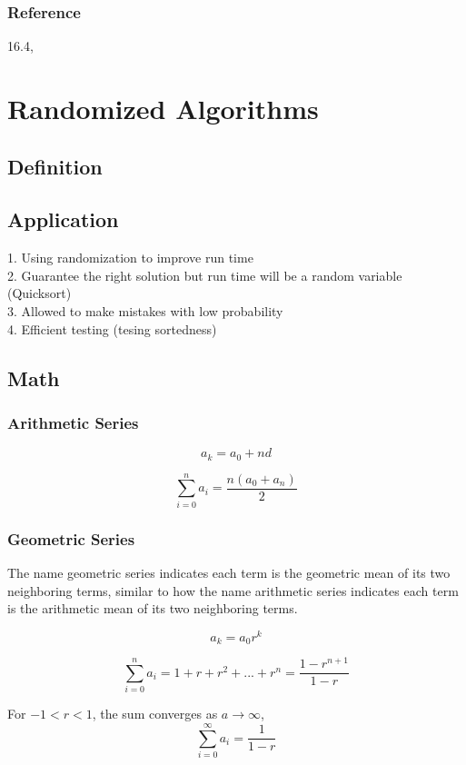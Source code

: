 \documentclass[12pt,article]{article}
\begin{document}
\subsubsection{Reference}
16.4, \cite{CLRS}


\newpage
\section{Randomized Algorithms}

\subsection{Definition}

\subsection{Application}
1. Using randomization to improve run time \\
2. Guarantee the right solution but run time will be a random variable (Quicksort) \\
3. Allowed to make mistakes with low probability \\
4. Efficient testing (tesing sortedness)

\subsection{Math}

\subsubsection{Arithmetic Series}

$$a_k = a_0 + nd$$

$$\sum^{n}_{i=0}a_i = \frac{n(a_0 + a_n)}{2}$$

\subsubsection{Geometric Series}
The name geometric series indicates each term is the geometric mean of its two neighboring terms, similar to how the name arithmetic series indicates each term is the arithmetic mean of its two neighboring terms.

$$a_k = a_0 r^k$$

$$\sum^{n}_{i=0}a_i = 1 + r + r^2 + ... + r^n = \frac{1 - r^{n+1}}{1 - r}$$

For $-1 < r < 1$, the sum converges as $a \rightarrow \infty$, 
$$\sum^{\infty}_{i=0}a_i = \frac{1}{1 - r}$$
\end{document}
